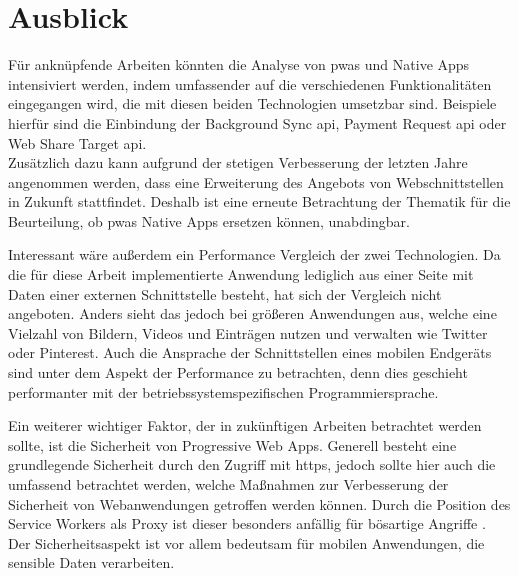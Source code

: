 \section{Ausblick}
Für anknüpfende Arbeiten könnten die Analyse von \acp{pwa} und Native Apps intensiviert werden, indem umfassender auf die verschiedenen Funktionalitäten eingegangen wird, die mit diesen beiden Technologien umsetzbar sind.
Beispiele hierfür sind die Einbindung der Background Sync \ac{api}, Payment Request \ac{api} oder Web Share Target \ac{api}.\\
Zusätzlich dazu kann aufgrund der stetigen Verbesserung der letzten Jahre angenommen werden, dass eine Erweiterung des Angebots von Webschnittstellen in Zukunft stattfindet.
Deshalb ist eine erneute Betrachtung der Thematik für die Beurteilung, ob \acp{pwa} Native Apps ersetzen können, unabdingbar.

Interessant wäre außerdem ein Performance Vergleich der zwei Technologien.
Da die für diese Arbeit implementierte Anwendung lediglich aus einer Seite mit Daten einer externen Schnittstelle besteht, hat sich der Vergleich nicht angeboten.
Anders sieht das jedoch bei größeren Anwendungen aus, welche eine Vielzahl von Bildern, Videos und Einträgen nutzen und verwalten wie Twitter oder Pinterest.
Auch die Ansprache der Schnittstellen eines mobilen Endgeräts sind unter dem Aspekt der Performance zu betrachten, denn dies geschieht performanter mit der betriebssystemspezifischen Programmiersprache.

Ein weiterer wichtiger Faktor, der in zukünftigen Arbeiten betrachtet werden sollte, ist die Sicherheit von Progressive Web Apps.
Generell besteht eine grundlegende Sicherheit durch den Zugriff mit \ac{https}, jedoch sollte hier auch die umfassend betrachtet werden, welche Maßnahmen zur Verbesserung der Sicherheit von Webanwendungen getroffen werden können.
Durch die Position des Service Workers als Proxy ist dieser besonders anfällig für bösartige Angriffe \cite{Lee.2018}.
Der Sicherheitsaspekt ist vor allem bedeutsam für mobilen Anwendungen, die sensible Daten verarbeiten.